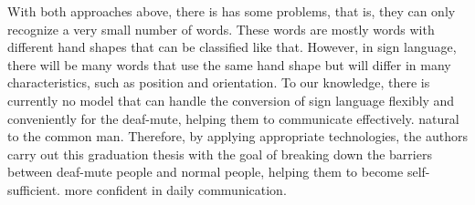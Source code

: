     With both approaches above, there is has some problems, that is, they can only recognize 
    a very small number of words. These words are mostly words with different hand shapes 
    that can be classified like that. However, in sign language, there will be many words 
    that use the same hand shape but will differ in many characteristics, such as position 
    and orientation. To our knowledge, there is currently no model that can handle the 
    conversion of sign language flexibly and conveniently for the deaf-mute, helping them 
    to communicate effectively. natural to the common man. Therefore, by applying appropriate 
    technologies, the authors carry out this graduation thesis with the goal of breaking down 
    the barriers between deaf-mute people and normal people, helping them to become self-sufficient. 
    more confident in daily communication.
